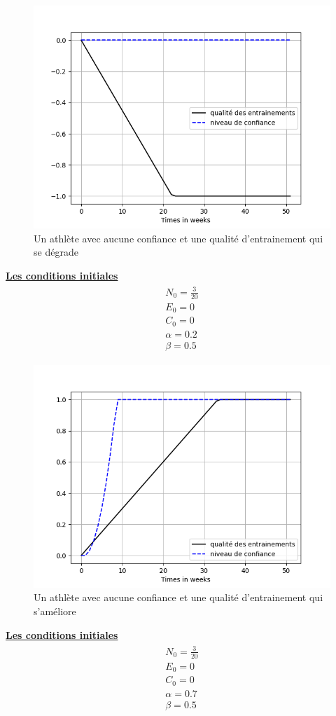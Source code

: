 \documentclass[
]{article}
\begin{document}
		\begin{figure}[H]
			\centering
			\includegraphics[width=\textwidth]{Graph5SImu1}
			\caption{Un athlète avec aucune confiance et une qualité d'entrainement qui se dégrade}
			\label{fig:1_5}
		\end{figure}
		
		\underline{\textbf{Les conditions initiales}}
		\begin{align*}
			\boxed{\begin{array}{c} N_0=\frac{3}{20} \\ E_0=0 \\
					C_0=0 \\
					\alpha=0.2 \\
					\beta=0.5
			\end{array}}
		\end{align*}
		
		\begin{figure}[H]
			\centering
			\includegraphics[width=\textwidth]{Graph6SImu1}
			\caption{Un athlète avec aucune confiance et une qualité d'entrainement qui s'améliore}
			\label{fig:1_6}
		\end{figure}
		
		\underline{\textbf{Les conditions initiales}}
		\begin{align*}
			\boxed{\begin{array}{c} N_0=\frac{3}{20} \\ E_0=0 \\
					C_0=0 \\
					\alpha=0.7 \\
					\beta=0.5
			\end{array}}
		\end{align*}
\end{document}
